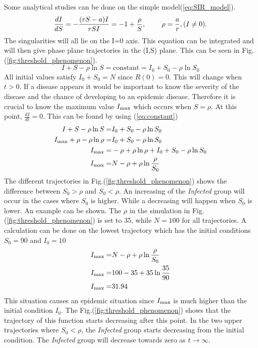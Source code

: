 \documentclass[%
twoside,                 %
final,                   %
10pt]{article}
\begin{document}
\vspace{3mm}


Some analytical studies can be done on the simple model(\ref{eq:SIR_model}).
\begin{equation} 
\frac{dI}{dS} = -\frac{(rS-a)I}{rSI} = -1 + \frac{\rho}{S},\hspace{8mm}\rho=\frac{a}{r}, (I\neq0).
\end{equation}
The singularities will all lie on the I=0 axis. This equation can be integrated and will then give phase plane trajectories in the (I,S) plane. This can be seen in Fig.(\ref{fig:threshold_phenomenon}).
\begin{equation} \label{eq:constant}
I+S-\rho \ln S = \textrm{constant} = I_0 + S_0 - \rho \ln S_0
\end{equation}
All initial values satisfy $I_0+S_0=N$ since $R(0) = 0$. This will change when $t>0$. If a disease appears it would be important to know the severity of the disease and the chance of developing to an epidemic disease. Therefore it is crucial to know the maximum value $I_{\textrm{max}}$ which occurs when $S=\rho$. At this point, $\frac{dI}{dt}=0$. This can be found by using (\ref{eq:constant})
\begin{align} 
I+S-\rho \ln S =& I_0 + S_0 - \rho \ln S_0 \nonumber \\
I_{\textrm{max}}+\rho-\rho \ln \rho =& I_0 + S_0 - \rho \ln S_0\nonumber \\
I_{\textrm{max}}=&- \rho+\rho \ln \rho + I_0 + S_0 - \rho \ln S_0\nonumber \\
I_{\textrm{max}}=&N - \rho + \rho \ln\frac{\rho}{S_0} \label{eq:max_I}
\end{align}
The different trajectories in Fig.(\ref{fig:threshold_phenomenon}) shows the difference between $S_0 > \rho$ and $S_0 < \rho$. An increasing of the \emph{Infected} group will occur in the cases where $S_0$ is higher. While a decreasing will happen when $S_0$ is lower. An example can be shown. The $\rho$ in the simulation in Fig.(\ref{fig:threshold_phenomenon}) is set to 35, while $N=100$ for all trajectories. A calculation can be done on the lowest trajectory which has the initial conditions $S_0= 90$ and $I_0= 10$
\begin{align*}
I_{\textrm{max}} =& N-\rho + \rho \ln \frac{\rho}{S_0}\\
I_{\textrm{max}} =& 100-35 + 35 \ln \frac{35}{90}\\
I_{\textrm{max}} =& 31.94
\end{align*}
This situation causes an epidemic situation since $I_{\textrm{max}}$ is much higher than the initial condition $I_0$. The Fig.(\ref{fig:threshold_phenomenon}) shows that the trajectory of this function starts decreasing after this point. In the two upper trajectories where $S_0 < \rho$, the \emph{Infected} group starts decreasing from the initial condition. The \emph{Infected} group will decrease towards zero as $t\rightarrow \infty$.
\end{document}
